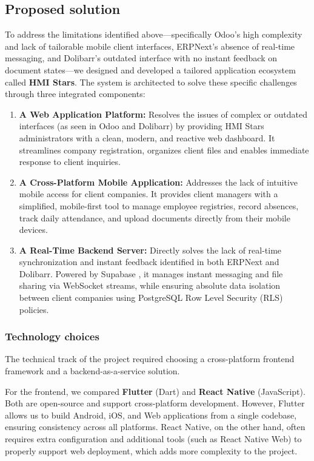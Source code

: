 \subsection{Proposed solution}
To address the limitations identified above—specifically Odoo's high complexity and lack of tailorable mobile client interfaces, ERPNext's absence of real-time messaging, and Dolibarr's outdated interface with no instant feedback on document states—we designed and developed a tailored application ecosystem called \textbf{HMI Stars}. The system is architected to solve these specific challenges through three integrated components:
\begin{enumerate}
    \item \textbf{A Web Application Platform:} Resolves the issues of complex or outdated interfaces (as seen in Odoo and Dolibarr) by providing HMI Stars administrators with a clean, modern, and reactive web dashboard. It streamlines company registration, organizes client files and enables immediate response to client inquiries.
    \item \textbf{A Cross-Platform Mobile Application:} Addresses the lack of intuitive mobile access for client companies. It provides client managers with a simplified, mobile-first tool to manage employee registries, record absences, track daily attendance, and upload documents directly from their mobile devices.
    \item \textbf{A Real-Time Backend Server:} Directly solves the lack of real-time synchronization and instant feedback identified in both ERPNext and Dolibarr. Powered by Supabase \cite{SupabaseDocs}, it manages instant messaging and file sharing via WebSocket streams, while ensuring absolute data isolation between client companies using PostgreSQL \cite{PostgresDocs} Row Level Security (RLS) policies.
\end{enumerate}

\subsubsection{Technology choices}
The technical track of the project required choosing a cross-platform frontend framework and a backend-as-a-service solution.

For the frontend, we compared \textbf{Flutter} \cite{FlutterDocs} (Dart) and \textbf{React Native} (JavaScript). Both are open-source and support cross-platform development. However, Flutter allows us to build Android, iOS, and Web applications from a single codebase, ensuring consistency across all platforms. React Native, on the other hand, often requires extra configuration and additional tools (such as React Native Web) to properly support web deployment, which adds more complexity to the project.

